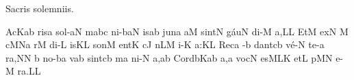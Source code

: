 
\beginhymn Sacris solemniis.


\nosolesmescustos
{}\Internote
\initiumgregorianum
{}%
\sgn {}Ac\scandicus Kab\egn
\sgn ris\punctum a\egn
\spatium
\sgn so{l-}\clivis aN\egn
{}m\quilismascandicus abc\egn
\sgn ni-\climacus baN\egn
\sgn {}is\punctum a\augmentum b\egn
\spatium
\divisiominima
\spatium
\sgn j{u}n\punctum a\egn
{}a{}\punctum M\egn
\spatium
\sgn si{nt}\punctum N\egn
\spatium
\sgn g{\'a}u\punctum N\egn
\sgn di-\punctum M\egn
\sgn {}a,\punctum L\augmentum L\egn
\spatium
\divisiominor
\spatium
\sgn {}Et\punctum M\egn
\spatium
\sgn {}ex\punctum N\egn
\spatium
\custos M
\lineaproxima
{}c\quilismascandicus MNa\egn
{}r\punctum M\egn
\sgn di-\punctum L\egn
\sgn {}is\punctum K\augmentum L\egn
\spatium
\divisiominima
\spatium
\sgn s{o}n\punctum M\egn
\sgn {}e{nt}\punctum K\egn
\spatium
{}c\engl{}\punctum J\egn
{}n\pes LM\egn
\sgn {}i-\punctum K\egn
\sgn {}a:\punctum K\augmentum L\egn
\spatium
\divisiomaior
\spatium
\sgn Rec\punctum a\egn
{}-\punctum b\egn
\sgn da{nt}\clivis cb\egn
\spatium
\sgn v{\'e}-\punctum N\egn
\sgn te-\punctum a\egn
\sgn ra,\punctum N\augmentum N\egn
\spatium
\divisiominima
\spatium
\custos b
\lineaproxima
\sgn n{o}-\clivis ba\egn
\sgn va{}\punctum b\egn
\spatium
\sgn si{nt}\clivis cb\egn
\spatium
{}m\punctum a\egn
\sgn ni-\punctum N\egn
\sgn {}a,\punctum a\augmentum b\egn
\spatium
\divisiominor
\spatium
\sgn C{o}{rd}\bmolle b\pes Ka\nonspatium\virga b\egn
\sgn {}a,\punctum a\egn
\spatium
\sgn v{o}c\punctum N\egn
\sgn {}es\climacus MLK\egn
\spatium
\sgn {}et\punctum L\egn
\spatium
{}p\pes MN\egn
\sgn {}e-\punctum M\egn
\sgn ra.\punctum L\augmentum L\egn
\spatium
\Finisgregoriana


\bigskip

\beginlyrics


